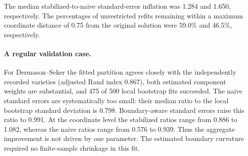 \begin{table}[t]
\centering
\scriptsize
\setlength{\tabcolsep}{3pt}
\caption{Dry Bean applications. The two final columns give the coordinate-
median ratio of an analytic standard error to the standard deviation from
successful local bootstrap fits. Boundary support is the number of observations
inside the fitted kernel tube. Local success is the percentage of 500 locally
optimized bootstrap refits that passed all convergence diagnostics.}
\label{tab:applications}

\smallskip
\begin{minipage}{0.94\linewidth}\small
The median stabilized-to-naive standard-error inflation was 1.284 and 1.650,
respectively.  The percentages of unrestricted refits remaining within a
maximum coordinate distance of 0.75 from the original solution were 59.0\%
and 46.5\%, respectively.
\end{minipage}
\end{table}

\paragraph{A regular validation case.}
For Dermason--Seker the fitted partition agrees closely with the independently
recorded varieties (adjusted Rand index 0.867), both estimated component
weights are substantial, and 475 of 500 local bootstrap fits succeeded.  The
naive standard errors are systematically too small: their median ratio to the
local bootstrap standard deviation is 0.798.  Boundary-aware standard errors
raise this ratio to 0.991.  At the coordinate level the stabilized ratios range
from 0.886 to 1.082, whereas the naive ratios range from 0.576 to 0.939.  Thus
the aggregate improvement is not driven by one parameter.  The estimated
boundary curvature required no finite-sample shrinkage in this fit.

